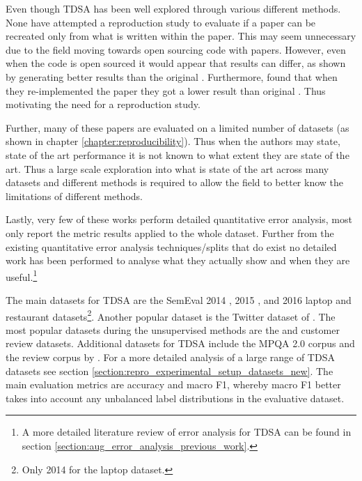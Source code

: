 Even though TDSA has been well explored through various different methods. None have attempted a reproduction study to evaluate if a paper can be recreated only from what is written within the paper. This may seem unnecessary due to the field moving towards open sourcing code with papers. However, even when the code is open sourced it would appear that results can differ, as shown by \citet{chen-etal-2017-recurrent} generating better results than the original \citep{tang-etal-2016-effective}. Furthermore, \citet{tay2018learning} found that when they re-implemented the paper they got a lower result than original \citep{tang-etal-2016-effective}. Thus motivating the need for a reproduction study.

Further, many of these papers are evaluated on a limited number of datasets (as shown in chapter \ref{chapter:reproducibility}). Thus when the authors may state, state of the art performance it is not known to what extent they are state of the art. Thus a large scale exploration into what is state of the art across many datasets and different methods is required to allow the field to better know the limitations of different methods.

Lastly, very few of these works perform detailed quantitative error analysis, most only report the metric results applied to the whole dataset. Further from the existing quantitative error analysis techniques/splits \citep{nguyen-shirai-2015-phrasernn, wang-etal-2017-tdparse, zhang-etal-2019-aspect} that do exist no detailed work has been performed to analyse what they actually show and when they are useful.\footnote{A more detailed literature review of error analysis for TDSA can be found in section \ref{section:aug_error_analysis_previous_work}.} 

The main datasets for TDSA are the SemEval 2014 \citep{pontiki-etal-2014-semeval}, 2015 \citep{pontiki-etal-2015-semeval}, and 2016 \citep{pontiki-etal-2016-semeval} laptop and restaurant datasets\footnote{Only 2014 for the laptop dataset.}. Another popular dataset is the Twitter dataset of \citet{dong-etal-2014-adaptive}. The most popular datasets during the unsupervised methods are the \citet{hu2004mining} and \citet{ding2008holistic} customer review datasets. Additional datasets for TDSA include the MPQA 2.0 corpus \citep{wiebe2005annotating} and the review corpus by \citet{toprak-etal-2010-sentence}. For a more detailed analysis of a large range of TDSA datasets see section \ref{section:repro_experimental_setup_datasets_new}. The main evaluation metrics are accuracy and macro F1, whereby macro F1 better takes into account any unbalanced label distributions in the evaluative dataset. 

